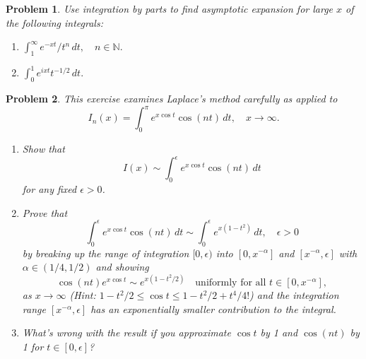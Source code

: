 \documentclass[11pt]{article}
\theoremstyle{problemstyle}
\newtheorem{problem}{Problem}
\begin{document}
\begin{problem}
  Use integration by parts to find asymptotic expansion for large $x$ of
    the following integrals:
  \begin{enumerate}
      \item $\displaystyle \int_1^\infty e^{-xt}/t^n \, dt, \quad n \in
        \mathbb{N}.$
      \item $\displaystyle \int_0^1 e^{ixt} t^{-1/2} \, dt.$
  \end{enumerate}
\end{problem}

\begin{problem}
  This exercise examines Laplace’s method carefully as applied to
  \[
  I_n(x) = \int_0^\pi e^{x \cos t} \cos(nt) \, dt, \quad x \to \infty.
  \]
  \begin{enumerate}
      \item Show that
      \[
      I(x) \sim \int_0^\epsilon e^{x \cos t} \cos(nt) \, dt
      \]
      for any fixed $\epsilon > 0$.
      \item Prove that
      \[
        \int_0^\epsilon e^{x \cos t} \cos(nt) \, dt \sim \int_0^\epsilon e^{x(1
        - t^2)} \, dt, \quad \epsilon > 0
      \]
      by breaking up the range of integration $[0, \epsilon)$ into $[0,
      x^{-\alpha}]$ and $[x^{-\alpha}, \epsilon]$ with $\alpha \in (1/4,
      1/2)$ and showing
      \[
        \cos(nt) e^{x \cos t} \sim e^{x(1 - t^2/2)} \quad \text{uniformly for
        all } t \in [0, x^{-\alpha}],
      \]
      as $x \to \infty$ (Hint: $1 - t^2/2 \leq \cos t \leq 1 - t^2/2 +
      t^4/4!$) and the integration range $[x^{-\alpha}, \epsilon]$ has an
      exponentially smaller contribution to the integral.
      \item What’s wrong with the result if you approximate $\cos t$ by 1 and
        $\cos(nt)$ by 1 for $t \in [0, \epsilon]$?
  \end{enumerate}
\end{problem}
\end{document}
